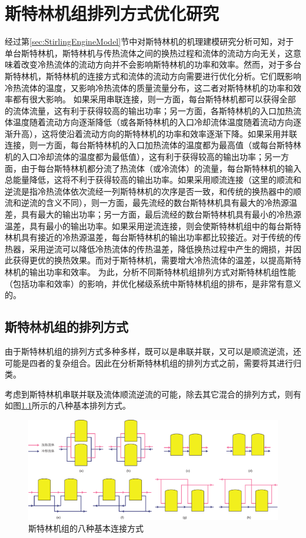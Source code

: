 \chapter{斯特林机组排列方式优化研究}
\label{cha:optSEA}

经过第\ref{sec:StirlingEngineModel}节中对斯特林机的机理建模研究分析可知，对于单台斯特林机，斯特林机与传热流体之间的换热过程和流体的流动方向无关，这意味着改变冷热流体的流动方向并不会影响斯特林机的功率和效率。然而，对于多台斯特林机，斯特林机的连接方式和流体的流动方向需要进行优化分析。它们既影响冷热流体的温度，又影响冷热流体的质量流量分布，这二者对斯特林机的功率和效率都有很大影响。
如果采用串联连接，则一方面，每台斯特林机都可以获得全部的流体流量，这有利于获得较高的输出功率；另一方面，各斯特林机的入口加热流体温度随着流动方向逐渐降低（或各斯特林机的入口冷却流体温度随着流动方向逐渐升高），这将使沿着流动方向的斯特林机的功率和效率逐渐下降。如果采用并联连接，则一方面，每台斯特林机的入口加热流体的温度都为最高值（或每台斯特林机的入口冷却流体的温度都为最低值），这有利于获得较高的输出功率；另一方面，由于每台斯特林机都分流了热流体（或冷流体）的流量，每台斯特林机的输入总能量降低，这将不利于获得较高的输出功率。如果采用顺流连接（这里的顺流和逆流是指冷热流体依次流经一列斯特林机的次序是否一致，和传统的换热器中的顺流和逆流的含义不同），则一方面，最先流经的数台斯特林机具有最大的冷热源温差，具有最大的输出功率；另一方面，最后流经的数台斯特林机具有最小的冷热源温差，具有最小的输出功率。如果采用逆流连接，则会使斯特林机组中的每台斯特林机具有接近的冷热源温差，每台斯特林机的输出功率都比较接近。对于传统的传热器，采用逆流可以降低冷热流体的传热温差，降低换热过程中产生的㶲损，并因此获得更优的换热效果。而对于斯特林机，需要增大冷热流体的温差，以提高斯特林机的输出功率和效率。
为此，分析不同斯特林机组排列方式对斯特林机组性能（包括功率和效率）的影响，并优化梯级系统中斯特林机组的排布，是非常有意义的。

\section{斯特林机组的排列方式}
\label{sec:connectionTypes}
由于斯特林机组的排列方式多种多样，既可以是串联并联，又可以是顺流逆流，还可能是四者的复杂组合。因此在分析斯特林机组的排列方式之前，需要将其进行归类。

考虑到斯特林机串联并联及流体顺流逆流的可能，除去其它混合的排列方式，则有如图\ref{fig:EightBasicSEA}所示的八种基本排列方式。

\noindent \begin{figure}[htbp]
\begin{center}
	\includegraphics[width = 0.9\columnwidth]{fig/EightBasicSEA}
	\caption{斯特林机组的八种基本连接方式}
	\label{fig:EightBasicSEA}
\end{center}
\end{figure}

